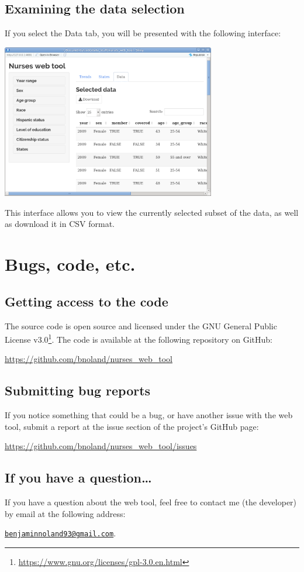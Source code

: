\documentclass[letterpaper,12pt]{article}
\begin{document}
\subsection{Examining the data selection}

If you select the Data tab, you will be presented with the following
interface:
\begin{center}
  \includegraphics[width=0.7\textwidth]{images/data_interface.png}
\end{center}
This interface allows you to view the currently selected subset of the
data, as well as download it in CSV format.

\section{Bugs, code, etc.}

\subsection{Getting access to the code}

The source code is open source and licensed under the GNU General
Public License
v3.0\footnote{\url{https://www.gnu.org/licenses/gpl-3.0.en.html}}. The
code is available at the following repository on GitHub:
\begin{center}
  \url{https://github.com/bnoland/nurses_web_tool}
\end{center}

\subsection{Submitting bug reports}

If you notice something that could be a bug, or have another issue
with the web tool, submit a report at the issue section of the
project's GitHub page:
\begin{center}
  \url{https://github.com/bnoland/nurses_web_tool/issues}
\end{center}

\subsection{If you have a question\ldots}

If you have a question about the web tool, feel free to contact me
(the developer) by email at the following address:
\begin{center}
  \href{mailto:benjaminnoland93@gmail.com}
    {\nolinkurl{benjaminnoland93@gmail.com}}.
\end{center}
\end{document}
